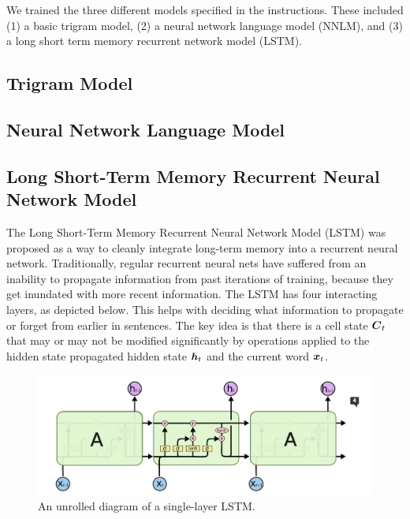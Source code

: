 \documentclass[11pt]{article}
\begin{document}
We trained the three different models specified in the instructions.  These included (1) a basic trigram model, (2) a neural network language model (NNLM), and (3) a long short term memory recurrent network model (LSTM).

\subsection{Trigram Model}

\subsection{Neural Network Language Model}


\subsection{Long Short-Term Memory Recurrent Neural Network Model}
The Long Short-Term Memory Recurrent Neural Network Model (LSTM) was proposed as a way to cleanly integrate long-term memory into a recurrent neural network.  Traditionally, regular recurrent neural nets have suffered from an inability to propagate information from past iterations of training, because they get inundated with more recent information.  The LSTM has four interacting layers, as depicted below.  This helps with deciding what information to propagate or forget from earlier in sentences.  The key idea is that there is a cell state $\boldsymbol{C}_t$ that may or may not be modified significantly by operations applied to the hidden state propagated hidden state $\boldsymbol{h}_t$ and the current word $\boldsymbol{x}_t$. 

\begin{figure}[H]
\begin{center}
\includegraphics[scale=0.5]{lstm}
\caption{An unrolled diagram of a single-layer LSTM.}
\end{center} 
\end{figure}
\end{document}
